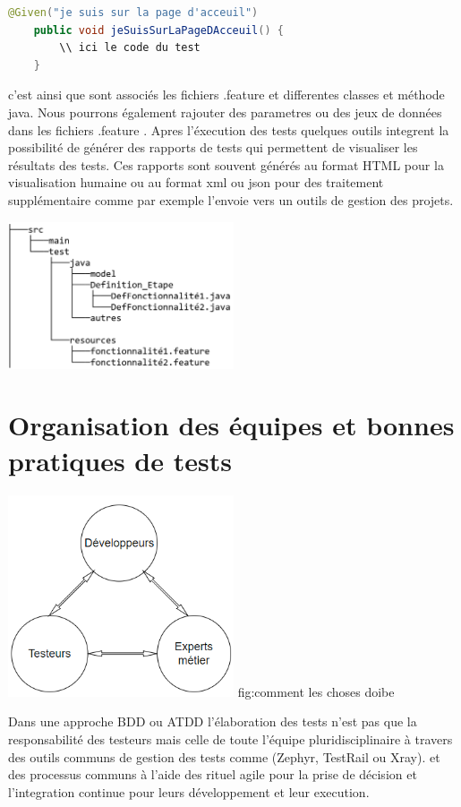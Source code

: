 \begin{lstlisting}[language=Java]
    @Given("je suis sur la page d'acceuil")
    public void jeSuisSurLaPageDAcceuil() {
        \\ ici le code du test
    }
\end{lstlisting}
c'est ainsi que sont associés les fichiers .feature et differentes classes et méthode java.
Nous pourrons également rajouter des parametres ou des jeux de données dans les fichiers .feature \parencite{BddInAction}.
Apres l'éxecution des tests quelques outils integrent la possibilité de générer des rapports de tests qui permettent de visualiser les résultats des tests. Ces rapports sont souvent générés au format HTML pour la visualisation humaine ou au format xml ou json pour des traitement supplémentaire comme par exemple l'envoie vers un outils de gestion des projets.

\begin{center}
    \includegraphics[width=0.5\textwidth]{filetree.png}

\end{center}


\section{Organisation des équipes et bonnes pratiques de tests }
\label{sec:organisation}

\begin{center}
    \includegraphics[width=0.5\textwidth]{interaction.png}
    \linebreak
fig:comment les choses doibe
\end{center}
Dans une approche BDD ou ATDD l'élaboration des tests n'est pas que la responsabilité des testeurs mais celle de toute l'équipe pluridisciplinaire à travers des outils communs de  gestion des tests comme (Zephyr, TestRail ou Xray).
et des processus communs à l'aide des rituel agile pour la prise de décision et l'integration continue pour leurs développement et leur execution.



